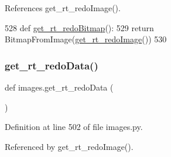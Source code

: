 References get\+\_\+rt\+\_\+redo\+Image().


\begin{DoxyCode}
528 \textcolor{keyword}{def }\hyperlink{namespaceimages_a94ee2c1c9ec4237ce584c034da68d6ea}{get\_rt\_redoBitmap}():
529     \textcolor{keywordflow}{return} BitmapFromImage(\hyperlink{namespaceimages_ae6da2122e70516d8aa6ff0f4e4141ade}{get\_rt\_redoImage}())
530 
\end{DoxyCode}
\mbox{\label{namespaceimages_a556fd7418509ce5167c7298675f08f76}} 
\subsubsection{\texorpdfstring{get\+\_\+rt\+\_\+redo\+Data()}{get\_rt\_redoData()}}
{\footnotesize\ttfamily def images.\+get\+\_\+rt\+\_\+redo\+Data (\begin{DoxyParamCaption}{ }\end{DoxyParamCaption})}



Definition at line 502 of file images.\+py.



Referenced by get\+\_\+rt\+\_\+redo\+Image().


